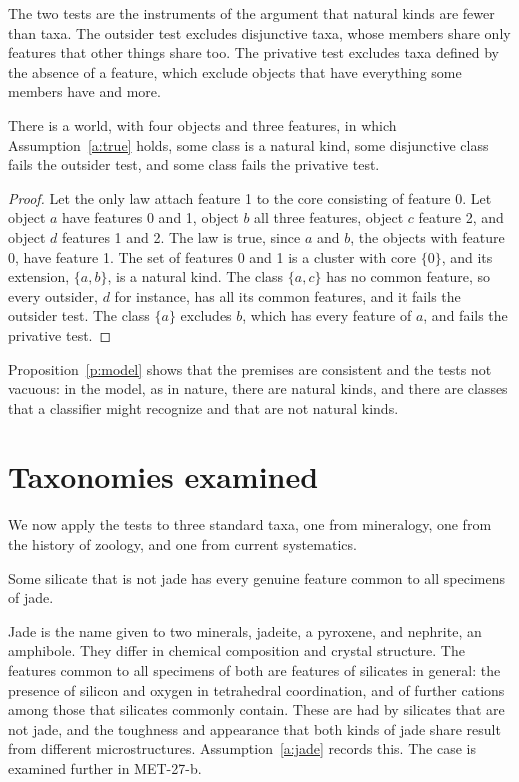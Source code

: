 \documentclass{situationist-preprint}
\begin{document}
The two tests are the instruments of the argument that natural kinds are fewer than taxa. The outsider test excludes disjunctive taxa, whose members share only features that other things share too. The privative test excludes taxa defined by the absence of a feature, which exclude objects that have everything some members have and more.

\begin{proposition}[A model]\label{p:model}
There is a world, with four objects and three features, in which Assumption~\ref{a:true} holds, some class is a natural kind, some disjunctive class fails the outsider test, and some class fails the privative test.
\end{proposition}

\begin{proof}
Let the only law attach feature 1 to the core consisting of feature 0. Let object $a$ have features 0 and 1, object $b$ all three features, object $c$ feature 2, and object $d$ features 1 and 2. The law is true, since $a$ and $b$, the objects with feature 0, have feature 1. The set of features 0 and 1 is a cluster with core $\{0\}$, and its extension, $\{a, b\}$, is a natural kind. The class $\{a, c\}$ has no common feature, so every outsider, $d$ for instance, has all its common features, and it fails the outsider test. The class $\{a\}$ excludes $b$, which has every feature of $a$, and fails the privative test.
\end{proof}

Proposition~\ref{p:model} shows that the premises are consistent and the tests not vacuous: in the model, as in nature, there are natural kinds, and there are classes that a classifier might recognize and that are not natural kinds.

\section{Taxonomies examined}\label{s:taxa}

We now apply the tests to three standard taxa, one from mineralogy, one from the history of zoology, and one from current systematics.

\begin{assumption}[Jade]\label{a:jade}
Some silicate that is not jade has every genuine feature common to all specimens of jade.
\end{assumption}

Jade is the name given to two minerals, jadeite, a pyroxene, and nephrite, an amphibole. They differ in chemical composition and crystal structure. The features common to all specimens of both are features of silicates in general: the presence of silicon and oxygen in tetrahedral coordination, and of further cations among those that silicates commonly contain. These are had by silicates that are not jade, and the toughness and appearance that both kinds of jade share result from different microstructures. Assumption~\ref{a:jade} records this. The case is examined further in MET-27-b.
\end{document}
